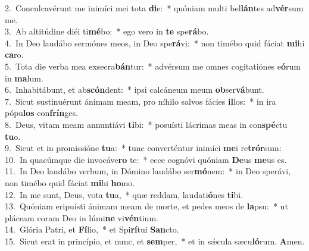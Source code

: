 {2.~}Conculcavérunt me inimíci mei tota \textbf{di}e:~* quóniam multi bel\textbf{lán}tes ad\textbf{vér}sum me.\\
{3.~}Ab altitúdine diéi ti\textbf{mé}bo:~* ego vero in \textbf{te} spe\textbf{rá}bo.\\
{4.~}In Deo laudábo sermónes meos, in Deo spe\textbf{rá}vi:~* non timébo quid fáciat \textbf{mi}hi \textbf{ca}ro.\\
{5.~}Tota die verba mea exsecra\textbf{bán}tur:~* advérsum me omnes cogitatiónes e\textbf{ó}rum in \textbf{ma}lum.\\
{6.~}Inhabitábunt, et ab\textbf{scón}dent:~* ipsi calcáneum meum \textbf{ob}ser\textbf{vá}bunt.\\
{7.~}Sicut sustinuérunt ánimam meam, pro níhilo salvos fácies \textbf{il}los:~* in ira pópu\textbf{los} con\textbf{frín}ges.\\
{8.~}Deus, vitam meam annuntiávi \textbf{ti}bi:~* posuísti lácrimas meas in con\textbf{spé}ctu \textbf{tu}o.\\
{9.~}Sicut et in promissióne \textbf{tu}a:~* tunc converténtur inimíci \textbf{me}i re\textbf{trór}sum:\\
{10.~}In quacúmque die invocáve\textbf{ro} te:~* ecce cognóvi quóniam \textbf{De}us \textbf{me}us es.\\
{11.~}In Deo laudábo verbum, in Dómino laudábo ser\textbf{mó}nem:~* in Deo sperávi, non timébo quid fáciat \textbf{mi}hi \textbf{ho}mo.\\
{12.~}In me sunt, Deus, vota \textbf{tu}a,~* quæ reddam, laudati\textbf{ó}nes \textbf{ti}bi.\\
{13.~}Quóniam eripuísti ánimam meam de morte, et pedes meos de \textbf{la}psu:~* ut pláceam coram Deo in lúmi\textbf{ne} vi\textbf{vén}tium.\\
{14.~}Glória Patri, et \textbf{Fí}lio,~* et Spi\textbf{rí}tui \textbf{San}cto.\\
{15.~}Sicut erat in princípio, et nunc, et \textbf{sem}per,~* et in sǽcula sæcu\textbf{ló}rum. \textbf{A}men.\\

